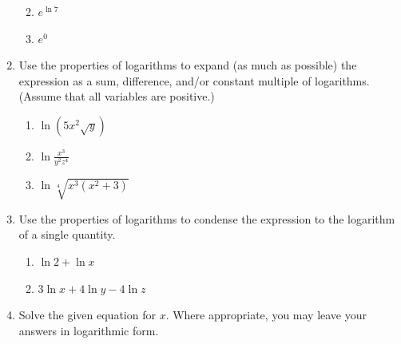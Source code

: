 \documentclass[12pt]{article}
\newif\ifans
\begin{document}
\begin{enumerate}
\begin{enumerate}
\ifans\fbox{$\frac{1}{3}$} \fi

\item $e^{\ln{7}}$

\ifans\fbox{7}\fi

\item $e^0$

\ifans\fbox{1}\fi

\end{enumerate}

\item Use the properties of logarithms to expand (as much as possible) the expression as a sum, difference, and/or constant multiple of logarithms.  (Assume that all variables are positive.)

\begin{enumerate}

\item $\displaystyle \ln{(5x^{2}\sqrt{y})}$

\ifans\fbox{$\displaystyle 1+2\ln{x}+\frac{1}{2}\ln{y}$} \fi

\item $\displaystyle \ln{\frac{x^3}{y^2z^4}}$

\ifans\fbox{$\displaystyle 3\ln{x}-2\log_{6}{y}-4\ln{z}$} \fi

\item $\displaystyle \ln{\sqrt[4]{x^{3}(x^{2}+3)}}$

\ifans\fbox{$\displaystyle \frac{3}{4}\ln{x}+\frac{1}{4}\ln{(x^{2}+3)}$} \fi

\end{enumerate}

\item Use the properties of logarithms to condense the expression to the logarithm of a single quantity.

\begin{enumerate}

\item $\displaystyle \ln{2}+\ln{x}$

\ifans\fbox{$\ln{(2x)}$} \fi
 
\item $\displaystyle 3\ln{x}+4\ln{y}-4\ln{z}$

\ifans\fbox{$\displaystyle \ln{\left(\frac{x^{3}y^{4}}{z^{4}}\right)}$} \fi

\end{enumerate}

\item Solve the given equation for $x$.  Where appropriate, you may leave your answers in logarithmic form.


\end{enumerate}
\end{document}
